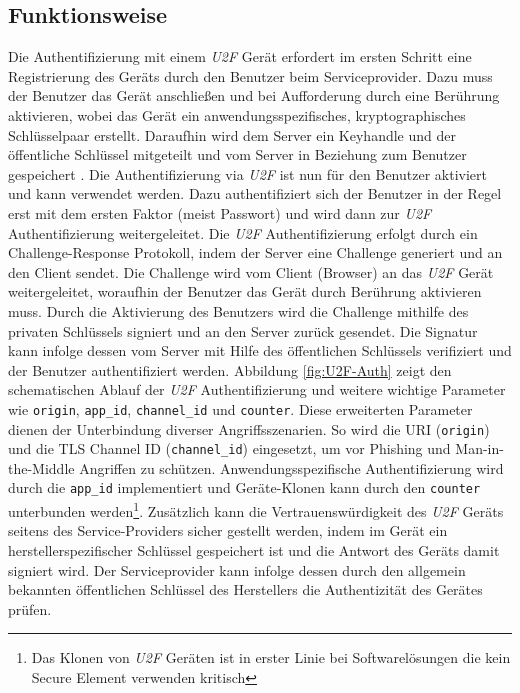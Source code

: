 \documentclass[11pt,a4paper,ngerman]{scrreprt}
\begin{document}
\subsection{Funktionsweise}
Die Authentifizierung mit einem \textit{U2F} Gerät erfordert im ersten Schritt eine Registrierung des Geräts durch den Benutzer beim Serviceprovider. Dazu muss der Benutzer das Gerät anschließen und bei Aufforderung durch eine Berührung aktivieren, wobei das Gerät ein anwendungsspezifisches, kryptographisches Schlüsselpaar erstellt. Daraufhin wird dem Server ein Keyhandle und der öffentliche Schlüssel mitgeteilt und vom Server in Beziehung zum Benutzer gespeichert \cite{u2fv1}. Die Authentifizierung via \textit{U2F} ist nun für den Benutzer aktiviert und kann verwendet werden. Dazu authentifiziert sich der Benutzer in der Regel erst mit dem ersten Faktor (meist Passwort) und wird dann zur \textit{U2F} Authentifizierung weitergeleitet. Die \textit{U2F} Authentifizierung erfolgt durch ein Challenge-Response Protokoll, indem der Server eine Challenge generiert und an den Client sendet. Die Challenge wird vom Client (Browser) an das \textit{U2F} Gerät weitergeleitet, woraufhin der Benutzer das Gerät durch Berührung aktivieren muss. Durch die Aktivierung des Benutzers wird die Challenge mithilfe des privaten Schlüssels signiert und an den Server zurück gesendet. Die Signatur kann infolge dessen vom Server mit Hilfe des öffentlichen Schlüssels verifiziert und der Benutzer authentifiziert werden. Abbildung \ref{fig:U2F-Auth} \cite{u2fTech} zeigt den schematischen Ablauf der \textit{U2F} Authentifizierung und weitere wichtige Parameter wie \texttt{origin}, \texttt{app\_id}, \texttt{channel\_id} und \texttt{counter}. Diese erweiterten Parameter dienen der Unterbindung diverser Angriffsszenarien. So wird die URI (\texttt{origin}) und die TLS Channel ID (\texttt{channel\_id}) eingesetzt, um vor Phishing und Man-in-the-Middle Angriffen zu schützen. Anwendungsspezifische Authentifizierung wird durch die \texttt{app\_id} implementiert und Geräte-Klonen kann durch den \texttt{counter} unterbunden werden\footnote{Das Klonen von \textit{U2F} Geräten ist in erster Linie bei Softwarelösungen die kein Secure Element verwenden kritisch}. Zusätzlich kann die Vertrauenswürdigkeit des \textit{U2F} Geräts seitens des Service-Providers sicher gestellt werden, indem im Gerät ein herstellerspezifischer Schlüssel gespeichert ist und die Antwort des Geräts damit signiert wird. Der Serviceprovider kann infolge dessen durch den allgemein bekannten öffentlichen Schlüssel des Herstellers die Authentizität des Gerätes prüfen.
\end{document}
